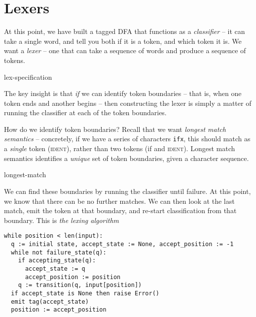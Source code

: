 \section{Lexers}
At this point, we have built a tagged DFA that functions as a \emph{classifier} -- it can take a single word, and tell you both if it is a token, and which token it is. We want a \emph{lexer} -- one that can take a sequence of words and produce a sequence of tokens. 

\begin{center}
{lex-specification}
\end{center}

The key insight is that \emph{if} we can identify token boundaries -- that is, when one token ends and another begins -- then constructing the lexer is simply a matter of running the classifier at each of the token boundaries.

How do we identify token boundaries? Recall that we want \emph{longest match semantics} -- concretely, if we have a series of characters \texttt{ifx}, this should match as a \emph{single} token (\textsc{ident}), rather than two tokens (\textsf{if} and \textsc{ident}). Longest match semantics identifies a \emph{unique} set of token boundaries, given a character sequence. 

\begin{center}
\vspace{5mm}
{longest-match}
\end{center}

We can find these boundaries by running the classifier until failure. At this point, we know that there can be no further matches. We can then look at the last match, emit the token at that boundary, and re-start classification from that boundary. This is \emph{the lexing algorithm} 

\begin{code}
\begin{lstlisting}[style=pseudocode]
while position < len(input):
  q := initial state, accept_state := None, accept_position := -1
  while not failure_state(q):
    if accepting_state(q):
      accept_state := q   
      accept_position := position
    q := transition(q, input[position])
  if accept_state is None then raise Error()  
  emit tag(accept_state)
  position := accept_position
\end{lstlisting}
\vspace{2mm}
\end{code}



